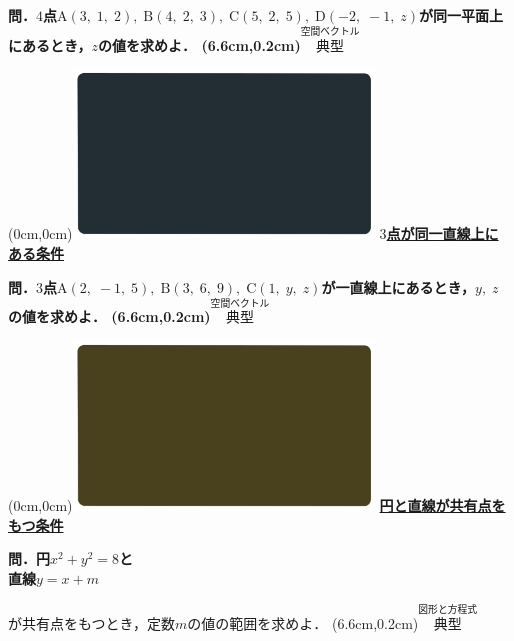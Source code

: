 \documentclass[10pt,
fleqn,
dvipdfmx,
uplatex
]{jsarticle}
\begin{document}
\Large 
\bf\boldmath 問．$4$点$\text{A}\left(3,\;1,\;2\right),\;\text{B}\left(4,\;2,\;3\right),\;\text{C}\left(5,\;2,\;5\right),\;\text{D}\left(-2,\;-1,\;z\right)$が同一平面上にあるとき，$z$の値を求めよ．
\at(6.6cm,0.2cm){\small\color{bradorange}$\overset{\text{空間ベクトル}}{\text{典型}}$}


\newpage



\at(0cm,0cm){\includegraphics[width=8cm,bb=0 0 1920 1080]{./youtube/thumbnails/templates/smart_background/空間ベクトル.jpeg}}
{\color{orange}\bf\boldmath\Large\underline{$3$点が同一直線上にある条件}}\vspace{0.3zw}

\LARGE 
\bf\boldmath 問．$3$点$\text{A}\left(2,\;-1,\;5\right),\;\text{B}\left(3,\;6,\;9\right),\;\text{C}\left(1,\;y,\;z\right)$が一直線上にあるとき，$y,\;z$の値を求めよ．
\at(6.6cm,0.2cm){\small\color{bradorange}$\overset{\text{空間ベクトル}}{\text{典型}}$}


\newpage

\at(0cm,0cm){\includegraphics[width=8cm,bb=0 0 1920 1080]{./youtube/thumbnails/templates/smart_background/図形と方程式.jpeg}}
{\color{orange}\bf\boldmath\Large\underline{円と直線が共有点をもつ条件}}\vspace{0.3zw}

\Large 
\bf\boldmath 問．円$x^2+y^2=8$と\\
\hfill 直線$y=x+m$

\LARGE 
が共有点をもつとき，定数$m$の値の範囲を求めよ．
\at(6.6cm,0.2cm){\small\color{bradorange}$\overset{\text{図形と方程式}}{\text{典型}}$}
\end{document}
